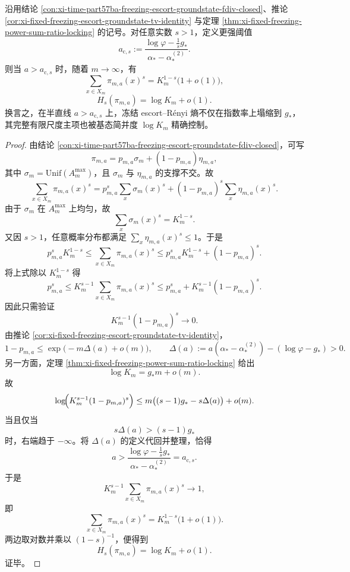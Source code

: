 \begin{theorem}\label{thm:xi-time-part65c-escort-renyi-finite-size-mainterm}
沿用结论 \ref{con:xi-time-part57ba-freezing-escort-groundstate-fdiv-closed}、推论 \ref{cor:xi-fixed-freezing-escort-groundstate-tv-identity} 与定理 \ref{thm:xi-fixed-freezing-power-sum-ratio-locking} 的记号。对任意实数 \(s>1\)，定义更强阈值
\[
a_{\mathrm c,s}:=
\frac{\log\varphi-\frac{1}{s}g_*}{\alpha_*-\alpha_*^{(2)}}.
\]
则当 \(a>a_{\mathrm c,s}\) 时，随着 \(m\to\infty\)，有
\[
\boxed{\;
\sum_{x\in X_m}\pi_{m,a}(x)^s
=
K_m^{1-s}\bigl(1+o(1)\bigr),\;}
\]
\[
\boxed{\;
H_s(\pi_{m,a})=\log K_m+o(1).\;}
\]
换言之，在半直线 \(a>a_{\mathrm c,s}\) 上，冻结 escort--Rényi 熵不仅在指数率上塌缩到 \(g_*\)，其完整有限尺度主项也被基态简并度 \(\log K_m\) 精确控制。
\end{theorem}
\begin{proof}
由结论 \ref{con:xi-time-part57ba-freezing-escort-groundstate-fdiv-closed}，可写
\[
\pi_{m,a}=p_{m,a}\sigma_m+(1-p_{m,a})\eta_{m,a},
\]
其中 \(\sigma_m=\mathrm{Unif}(A_m^{\max})\)，且 \(\sigma_m\) 与 \(\eta_{m,a}\) 的支撑不交。故
\[
\sum_{x\in X_m}\pi_{m,a}(x)^s
=
p_{m,a}^s\sum_x \sigma_m(x)^s
+(1-p_{m,a})^s\sum_x \eta_{m,a}(x)^s.
\]
由于 \(\sigma_m\) 在 \(A_m^{\max}\) 上均匀，故
\[
\sum_x \sigma_m(x)^s=K_m^{1-s}.
\]
又因 \(s>1\)，任意概率分布都满足 \(\sum_x \eta_{m,a}(x)^s\le 1\)。于是
\[
p_{m,a}^sK_m^{1-s}
\le
\sum_{x\in X_m}\pi_{m,a}(x)^s
\le
p_{m,a}^sK_m^{1-s}+(1-p_{m,a})^s.
\]
将上式除以 \(K_m^{1-s}\) 得
\[
p_{m,a}^s
\le
K_m^{s-1}\sum_{x\in X_m}\pi_{m,a}(x)^s
\le
p_{m,a}^s+K_m^{s-1}(1-p_{m,a})^s.
\]
因此只需验证
\[
K_m^{s-1}(1-p_{m,a})^s\to 0.
\]
由推论 \ref{cor:xi-fixed-freezing-escort-groundstate-tv-identity}，
\[
1-p_{m,a}\le \exp\!\bigl(-m\Delta(a)+o(m)\bigr),
\qquad
\Delta(a):=a(\alpha_*-\alpha_*^{(2)})-(\log\varphi-g_*)>0.
\]
另一方面，定理 \ref{thm:xi-fixed-freezing-power-sum-ratio-locking} 给出
\[
\log K_m=g_*m+o(m).
\]
故
\[
\log\!\Bigl(K_m^{s-1}(1-p_{m,a})^s\Bigr)
\le
m\bigl((s-1)g_*-s\Delta(a)\bigr)+o(m).
\]
当且仅当
\[
s\Delta(a)>(s-1)g_*
\]
时，右端趋于 \(-\infty\)。将 \(\Delta(a)\) 的定义代回并整理，恰得
\[
a>\frac{\log\varphi-\frac{1}{s}g_*}{\alpha_*-\alpha_*^{(2)}}=a_{\mathrm c,s}.
\]
于是
\[
K_m^{s-1}\sum_{x\in X_m}\pi_{m,a}(x)^s\to 1,
\]
即
\[
\sum_{x\in X_m}\pi_{m,a}(x)^s
=
K_m^{1-s}\bigl(1+o(1)\bigr).
\]
两边取对数并乘以 \((1-s)^{-1}\)，便得到
\[
H_s(\pi_{m,a})=\log K_m+o(1).
\]
证毕。
\end{proof}

\endinput
